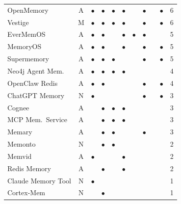 \begin{table}[!t]
\begin{tabular}{@{}lc cccccccc r@{}}
OpenMemory           & A & $\bullet$ & $\bullet$ & $\bullet$ & $\bullet$ &           & $\bullet$ &           & $\bullet$ & 6 \\
Vestige              & M & $\bullet$ & $\bullet$ & $\bullet$ & $\bullet$ &           & $\bullet$ &           & $\bullet$ & 6 \\
EverMemOS            & A & $\bullet$ & $\bullet$ &           & $\bullet$ & $\bullet$ & $\bullet$ &           &           & 5 \\
MemoryOS             & A & $\bullet$ & $\bullet$ &           & $\bullet$ &           & $\bullet$ &           & $\bullet$ & 5 \\
Supermemory          & A & $\bullet$ & $\bullet$ & $\bullet$ &           &           & $\bullet$ &           & $\bullet$ & 5 \\
Neo4j Agent Mem.     & A & $\bullet$ & $\bullet$ & $\bullet$ & $\bullet$ &           &           &           &           & 4 \\
OpenClaw Redis       & A & $\bullet$ & $\bullet$ &           &           &           & $\bullet$ &           & $\bullet$ & 4 \\
ChatGPT Memory       & N & $\bullet$ &           &           &           &           & $\bullet$ &           & $\bullet$ & 3 \\
Cognee               & A &           & $\bullet$ & $\bullet$ & $\bullet$ &           &           &           &           & 3 \\
MCP Mem.\ Service    & A &           & $\bullet$ & $\bullet$ & $\bullet$ &           &           &           &           & 3 \\
Memary               & A &           & $\bullet$ & $\bullet$ &           &           & $\bullet$ &           &           & 3 \\
Memonto              & N &           & $\bullet$ & $\bullet$ &           &           &           &           &           & 2 \\
Memvid               & A & $\bullet$ &           &           & $\bullet$ &           &           &           &           & 2 \\
Redis Memory         & A &           & $\bullet$ &           & $\bullet$ &           &           &           &           & 2 \\
Claude Memory Tool   & N & $\bullet$ &           &           &           &           &           &           &           & 1 \\
Cortex-Mem           & N &           & $\bullet$ &           &           &           &           &           &           & 1 \\

\end{tabular}
\end{table}
